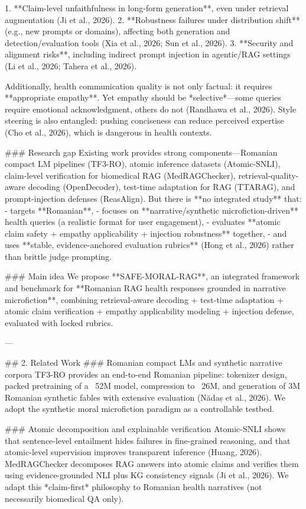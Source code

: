 1. **Claim-level unfaithfulness in long-form generation**, even under retrieval augmentation (Ji et al., 2026).
2. **Robustness failures under distribution shift** (e.g., new prompts or domains), affecting both generation and detection/evaluation tools (Xia et al., 2026; Sun et al., 2026).
3. **Security and alignment risks**, including indirect prompt injection in agentic/RAG settings (Li et al., 2026; Tahera et al., 2026).

Additionally, health communication quality is not only factual: it requires **appropriate empathy**. Yet empathy should be *selective*—some queries require emotional acknowledgment, others do not (Randhawa et al., 2026). Style steering is also entangled: pushing conciseness can reduce perceived expertise (Cho et al., 2026), which is dangerous in health contexts.

### Research gap
Existing work provides strong components—Romanian compact LM pipelines (TF3-RO), atomic inference datasets (Atomic-SNLI), claim-level verification for biomedical RAG (MedRAGChecker), retrieval-quality-aware decoding (OpenDecoder), test-time adaptation for RAG (TTARAG), and prompt-injection defenses (ReasAlign). But there is **no integrated study** that:
- targets **Romanian**,
- focuses on **narrative/synthetic microfiction-driven** health queries (a realistic format for user engagement),
- evaluates **atomic claim safety + empathy applicability + injection robustness** together,
- and uses **stable, evidence-anchored evaluation rubrics** (Hong et al., 2026) rather than brittle judge prompting.

### Main idea
We propose **SAFE-MORAL-RAG**, an integrated framework and benchmark for **Romanian RAG health responses grounded in narrative microfiction**, combining retrieval-aware decoding + test-time adaptation + atomic claim verification + empathy applicability modeling + injection defense, evaluated with locked rubrics.

---

## 2. Related Work
### Romanian compact LMs and synthetic narrative corpora
TF3-RO provides an end-to-end Romanian pipeline: tokenizer design, packed pretraining of a ~52M model, compression to ~26M, and generation of 3M Romanian synthetic fables with extensive evaluation (Nădaș et al., 2026). We adopt the synthetic moral microfiction paradigm as a controllable testbed.

### Atomic decomposition and explainable verification
Atomic-SNLI shows that sentence-level entailment hides failures in fine-grained reasoning, and that atomic-level supervision improves transparent inference (Huang, 2026). MedRAGChecker decomposes RAG answers into atomic claims and verifies them using evidence-grounded NLI plus KG consistency signals (Ji et al., 2026). We adapt this *claim-first* philosophy to Romanian health narratives (not necessarily biomedical QA only).

